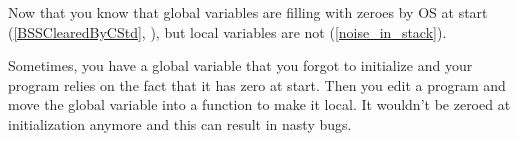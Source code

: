 
Now that you know that global variables are filling with zeroes by \ac{OS} at start
(\ref{BSSClearedByCStd}, ),
but local variables are not (\ref{noise_in_stack}).

Sometimes, you have a global variable that you forgot to initialize and your program relies on the fact that it has
zero at start.
Then you edit a program and move the global variable into a function to make it local.
It wouldn't be zeroed at initialization anymore and this can result in nasty bugs.

